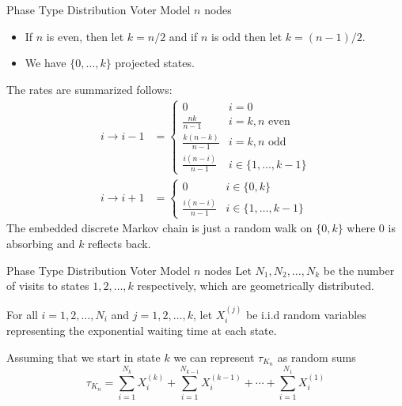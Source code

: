 \documentclass{beamer}
\theoremstyle{definition}
\begin{document}
\begin{frame}{Phase Type Distribution Voter Model $n$ nodes}
    \begin{itemize}
        \item If $n$ is even, then let $k = n / 2$ and if $n$ is odd then let $k = (n - 1)/2$.
        \item We have $\{0,\ldots, k\}$ projected states.
    \end{itemize}

The rates are summarized follows:
\begin{align*}
    i \to i - 1 &= \begin{cases}
        0 & i = 0\\
        \frac{nk}{n - 1}  & i = k, n \text{ even}\\
        \frac{k (n - k)}{n - 1} & i = k, n \text{ odd}\\
        \frac{i (n - i)}{n - 1}  & i \in \{1,\ldots, k - 1\}
    \end{cases}\\
    i \to i + 1 &= \begin{cases}
        0 & i \in \{0, k\}\\
        \frac{i (n - i)}{n - 1}  & i \in \{1,\ldots, k - 1\}
    \end{cases}
\end{align*}
The embedded discrete Markov chain is just a random walk on $\{0, k\}$ where 0 is absorbing and $k$ reflects back.
\end{frame}

\begin{frame}{Phase Type Distribution Voter Model $n$ nodes}
   Let $N_1, N_2, \ldots, N_k$ be the number of visits to states $1, 2, \ldots, k$ respectively, which are geometrically distributed.

For all $i = 1,2,\ldots, N_i$ and $j = 1,2,\ldots, k$, let $X_i^{(j)}$ be i.i.d random variables representing the exponential waiting time at each state.

Assuming that we start in state $k$ we can represent $\tau_{K_n}$ as random sums
$$
    \tau_{K_n} = \sum_{i = 1}^{N_k} X_i^{(k)} + \sum_{i = 1}^{N_{k - 1}} X_i^{(k - 1)} + \cdots + \sum_{i = 1}^{N_1} X_i^{(1)}
$$
\end{frame}
\end{document}
